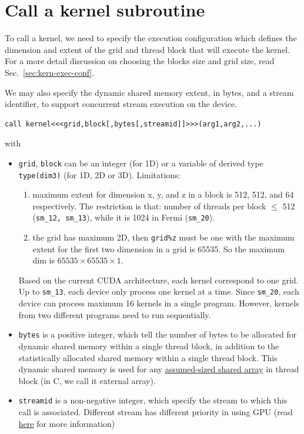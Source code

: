 \section{Call a kernel subroutine}
\label{sec:call-kernel}

To call a kernel, we need to specify the execution configuration which
defines the dimension and extent of the grid and thread block that
will execute the kernel. For a more detail discussion on choosing the
blocks size and grid size, read Sec.~\ref{sec:kern-exec-conf}.

We may also specify the dynamic shared memory extent, in bytes, and a
stream identifier, to support concurrent stream execution on the
device.

\begin{lstlisting}
call kernel<<<grid,block[,bytes[,streamid]]>>>(arg1,arg2,...)
\end{lstlisting}
with 
\begin{itemize}
\item \verb.grid., \verb.block. can be an integer (for 1D) or a
  variable of derived type \lstinline{type(dim3)} (for 1D, 2D or
  3D). Limitations: 
  \begin{enumerate}
  \item maximum extent for dimension x, y, and z in a block is 512,
    512, and 64 respectively. The restriction is that: number of
    threads per block $\le$ 512 (\verb!sm_12, sm_13!), while it is
    1024 in Fermi (\verb!sm_20!).
  \item the grid has maximum 2D, then \verb.grid%z. must
    be one with the maximum extent for the first two dimension in a
    grid is 65535. So the maximum dim is $65535\times 65535\times 1$.
  \end{enumerate}
  Based on the current CUDA architecture, each kernel correspond to
  one grid. Up to \verb!sm_13!, each device only process one kernel at
  a time. Since \verb!sm_20!, each device can process maximum 16
  kernels in a single program. However, kernels from two different
  programs need to run sequentially. 
\item \verb.bytes. is a positive integer, which tell the number of
  bytes to be allocated for dynamic shared memory within a single
  thread block, in addition to the statistically allocated shared
  memory within a single thread block. This dynamic shared memory is
  used for any \hyperref[lab:assa]{assumed-sized shared array} in
  thread block (in C, we call it external array).
\item \verb.streamid. is a non-negative integer, which specify the
  stream to which this call is associated. Different stream has
  different priority in using GPU (read
  \hyperref[sec:conc-stre-exec]{here} for more information)
\end{itemize}


